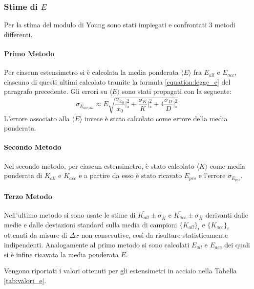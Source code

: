 \documentclass[a4paper,11pt,oneside]{article}
\begin{document}
\subsubsection*{Stime di $E$}
Per la stima del modulo di Young sono stati impiegati e confrontati 3 metodi differenti.

\paragraph{Primo Metodo}
Per ciascun estensimetro si è calcolata la media ponderata $\langle E \rangle $ fra $E_{all}$ e $E_{acc}$, ciascuno di questi ultimi calcolato tramite la formula \ref{equation:legge_e} del paragrafo precedente. Gli errori su $\langle E \rangle$ sono stati propagati con la seguente:
\begin{equation}
    \label{eq:propagazione_particolare}
    \sigma_{E_{acc, all}} \approx E\sqrt{\frac{\sigma_{x_{0}}}{x_{0}}\Big|_{\ast}^2+\frac{\sigma_{K}}{K}\Big|_{\ast}^2+4\frac{\sigma_{D}}{D}\Big|_{\ast}^2}
\end{equation}
L'errore associato alla $\langle E \rangle $ invece è stato calcolato come errore della media ponderata.

\paragraph{Secondo Metodo}
Nel secondo metodo, per ciascun estensimetro, è stato calcolato $\langle K \rangle $ come media ponderata di $K_{all}$ e $K_{acc}$ e a partire da esso è stato ricavato $E_{pes}$ e l'errore $\sigma_{E_{pes}}$.

\paragraph{Terzo Metodo}
Nell'ultimo metodo si sono usate le stime di $\overline{K_{all}} \pm \sigma_{\overline{K}}$ e $\overline{K_{acc}} \pm \sigma_{\overline{K}}$ derivanti dalle medie e dalle deviazioni standard sulla media di campioni $\{ K_{all} \}_i$ e $\{ K_{acc}\}_i $ ottenuti da misure di $\Delta x$ non consecutive, così da risultare statisticamente indipendenti. Analogamente al primo metodo si sono calcolati $E_{all}$ e $E_{acc}$ dei quali si è infine ricavata la media ponderata $\overline{E}$.

Vengono riportati i valori ottenuti per gli estensimetri in acciaio nella Tabella \ref{tab:valori_e}.\\
\end{document}
